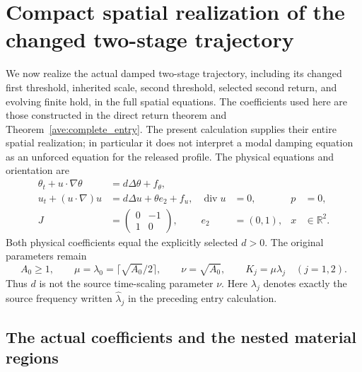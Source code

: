 \section{Compact spatial realization of the changed two-stage trajectory}
\label{ms:section}

We now realize the actual damped two-stage trajectory, including its
changed first threshold, inherited scale, second threshold, selected
second return, and evolving finite hold, in the full spatial equations.
The coefficients used here are those constructed in the direct return
theorem and Theorem~\ref{ave:complete_entry}. The present calculation supplies their entire
spatial realization; in particular it does not interpret a modal
damping equation as an unforced equation for the released profile.
The physical equations and orientation are
\begin{align*}
 \theta_t+u\cdot\nabla\theta&=d\Delta\theta+f_\theta,\\
 u_t+(u\cdot\nabla)u&=d\Delta u+\theta e_2+f_u,
 &\operatorname{div}u&=0,&p&=0,\\
 J&=\begin{pmatrix}0&-1\\1&0\end{pmatrix},
 &e_2&=(0,1),&x&\in\mathbb R^2.
\end{align*}
Both physical coefficients equal the explicitly selected $d>0$.
The original parameters remain
\[
 A_0\geq1,\qquad\mu=\lambda_0=\lceil\sqrt{A_0}/2\rceil,
 \qquad\nu=\sqrt{A_0},\qquad K_j=\mu\lambda_j\quad(j=1,2).
\]
Thus $d$ is not the source time-scaling parameter $\nu$.
Here $\lambda_j$ denotes exactly the source frequency written
$\widehat\lambda_j$ in the preceding entry calculation.

\subsection{The actual coefficients and the nested material regions}

